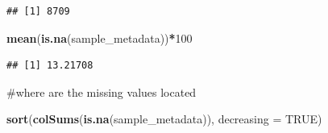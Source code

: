 \documentclass[
]{article}
\newenvironment{Shaded}{\begin{snugshade}}{\end{snugshade}}
\newcommand{\AttributeTok}[1]{\textcolor[rgb]{0.13,0.29,0.53}{#1}}
\newcommand{\ConstantTok}[1]{\textcolor[rgb]{0.56,0.35,0.01}{#1}}
\newcommand{\DecValTok}[1]{\textcolor[rgb]{0.00,0.00,0.81}{#1}}
\newcommand{\FunctionTok}[1]{\textcolor[rgb]{0.13,0.29,0.53}{\textbf{#1}}}
\newcommand{\NormalTok}[1]{#1}
\newcommand{\SpecialCharTok}[1]{\textcolor[rgb]{0.81,0.36,0.00}{\textbf{#1}}}
\begin{document}
\begin{verbatim}
## [1] 8709
\end{verbatim}

\begin{Shaded}
\begin{Highlighting}[]
\FunctionTok{mean}\NormalTok{(}\FunctionTok{is.na}\NormalTok{(sample\_metadata))}\SpecialCharTok{*}\DecValTok{100}
\end{Highlighting}
\end{Shaded}

\begin{verbatim}
## [1] 13.21708
\end{verbatim}

\#where are the missing values located

\begin{Shaded}
\begin{Highlighting}[]
\FunctionTok{sort}\NormalTok{(}\FunctionTok{colSums}\NormalTok{(}\FunctionTok{is.na}\NormalTok{(sample\_metadata)), }\AttributeTok{decreasing =} \ConstantTok{TRUE}\NormalTok{)}
\end{Highlighting}
\end{Shaded}
\end{document}
